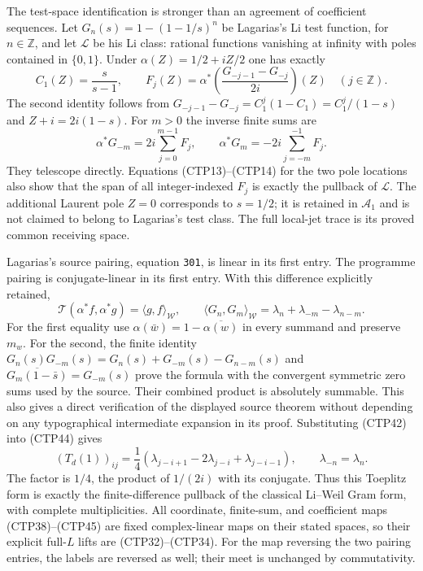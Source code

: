 The test-space identification is stronger than an agreement of
coefficient sequences. Let
$G_n(s)=1-(1-1/s)^n$ be Lagarias's Li test function, for
$n\in\mathbb Z$, and let $\mathscr L$ be his Li class: rational
functions vanishing at infinity with poles contained in $\{0,1\}$.
Under $\alpha(Z)=1/2+iZ/2$ one has exactly
\begin{equation}\tag{CTP42}
 C_1(Z)=\frac{s}{s-1},\qquad
 F_j(Z)=\alpha^*\left(\frac{G_{-j-1}-G_{-j}}{2i}\right)(Z)
 \quad(j\in\mathbb Z).
\end{equation}
The second identity follows from
$G_{-j-1}-G_{-j}=C_1^j(1-C_1)=C_1^j/(1-s)$ and
$Z+i=2i(1-s)$. For $m>0$ the inverse finite sums are
\begin{equation}\tag{CTP43}
 \alpha^*G_{-m}=2i\sum_{j=0}^{m-1}F_j,
 \qquad \alpha^*G_m=-2i\sum_{j=-m}^{-1}F_j.
\end{equation}
They telescope directly. Equations (CTP13)--(CTP14) for the two
pole locations also show that the span of all integer-indexed
$F_j$ is exactly the pullback of $\mathscr L$.
The additional Laurent pole $Z=0$ corresponds to $s=1/2$; it
is retained in $\mathscr A_1$ and is not claimed to belong to
Lagarias's test class. The full local-jet trace is its proved
common receiving space.

Lagarias's source pairing, equation \texttt{301}, is linear in
its first entry. The programme pairing is conjugate-linear
in its first entry. With this difference explicitly retained,
\begin{equation}\tag{CTP44}
 \mathcal T(\alpha^*f,\alpha^*g)
       =\langle g,f\rangle_{\mathcal W},\qquad
 \langle G_n,G_m\rangle_{\mathcal W}
       =\lambda_n+\lambda_{-m}-\lambda_{n-m}.
\end{equation}
For the first equality use $\alpha(\bar w)=1-\overline{\alpha(w)}$
in every summand and preserve $m_w$. For the second, the finite
identity
$G_n(s)G_{-m}(s)=G_n(s)+G_{-m}(s)-G_{n-m}(s)$ and
$\overline{G_m(1-\bar s)}=G_{-m}(s)$ prove the formula with
the convergent symmetric zero sums used by the source.
Their combined product is absolutely summable. This also gives
a direct verification of the displayed source theorem without
depending on any typographical intermediate expansion in its
proof. Substituting (CTP42) into (CTP44) gives
\begin{equation}\tag{CTP45}
 (T_d(1))_{ij}=\frac14
   (\lambda_{j-i+1}-2\lambda_{j-i}+\lambda_{j-i-1}),
 \qquad \lambda_{-n}=\lambda_n.
\end{equation}
The factor is $1/4$, the product of $1/(2i)$ with its conjugate.
Thus this Toeplitz form is exactly the finite-difference pullback
of the classical Li--Weil Gram form, with complete multiplicities.
All coordinate, finite-sum, and coefficient maps
(CTP38)--(CTP45) are fixed complex-linear maps on their stated
spaces, so their explicit full-$L$ lifts are (CTP32)--(CTP34).
For the map reversing the two pairing entries, the labels are
reversed as well; their meet is unchanged by commutativity.

